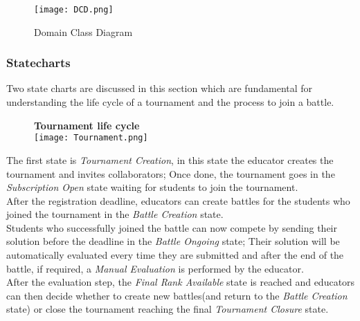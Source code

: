 \documentclass{article}
\begin{document}
\begin{figure}[H]
    \centering
    \texttt{[image: DCD.png]}
    \caption{Domain Class Diagram}
    \label{fig:DCD}
\end{figure}


\subsubsection{Statecharts}
Two state charts are discussed in this section which are fundamental for understanding the life cycle of a tournament and the process to join a battle. \\

\begin{figure}[H]
    \centering
    \textbf{Tournament life cycle} \\
    \texttt{[image: Tournament.png]}
\end{figure}
\noindent
The first state is \textit{Tournament Creation}, in this state the educator creates the tournament and invites collaborators;
Once done, the tournament goes in the \textit{Subscription Open} state waiting for students to join the tournament. \\
After the registration deadline, educators can create battles for the students who joined the tournament in the \textit{Battle Creation} state. \\
Students who successfully joined the battle can now compete by sending their solution before the deadline in the \textit{Battle Ongoing} state; Their solution will be automatically evaluated every time they are submitted and after the end of the battle, if required, a \textit{Manual Evaluation} is performed by the educator. \\
After the evaluation step, the \textit{Final Rank Available} state is reached and educators can then decide whether to create new battles(and return to the \textit{Battle Creation} state) or close the tournament reaching the final \textit{Tournament Closure} state. \\
\end{document}
